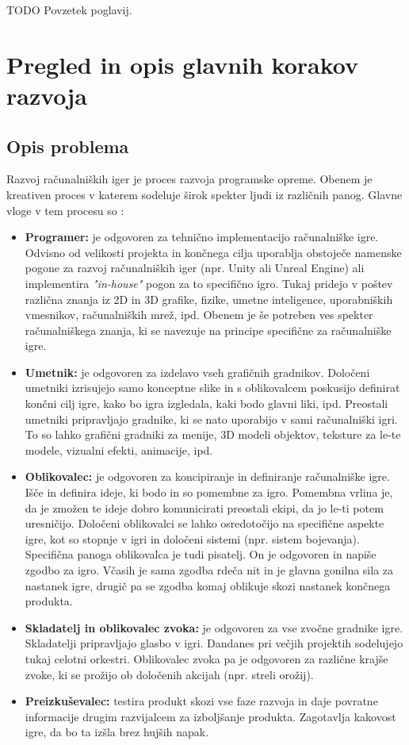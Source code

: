 \documentclass[12pt,a4paper,twoside]{book}
\begin{document}
TODO Povzetek poglavij.

\chapter{Pregled in opis glavnih korakov razvoja}\thispagestyle{fancy}
\section{Opis problema}
\label{sec:opis_problema}
Razvoj računalniških iger je proces razvoja programske opreme. Obenem je kreativen proces v katerem sodeluje širok spekter ljudi iz različnih panog. Glavne vloge v tem procesu so \cite{rogers2014level}:
\begin{itemize}
	\item \textbf{Programer:} je odgovoren za tehnično implementacijo računalniške igre. Odvisno od velikosti projekta in končnega cilja uporablja obstoječe namenske pogone za razvoj računalniških iger (npr. Unity ali Unreal Engine) ali implementira \textit{"in-house"} pogon za to specifično igro. Tukaj pridejo v poštev različna znanja iz 2D in 3D grafike, fizike, umetne inteligence, uporabniških vmesnikov, računalniških mrež, ipd. Obenem je še potreben ves spekter računalniškega znanja, ki se navezuje na principe specifične za računalniške igre.
	\item \textbf{Umetnik:} je odgovoren za izdelavo vseh grafičnih gradnikov. Določeni umetniki izrisujejo samo konceptne slike in s oblikovalcem poskusijo definirat končni cilj igre, kako bo igra izgledala, kaki bodo glavni liki, ipd. Preostali umetniki pripravljajo gradnike, ki se nato uporabijo v sami računalniški igri. To so lahko grafični gradniki za menije, 3D modeli objektov, teksture za le-te modele, vizualni efekti, animacije, ipd.
	\item \textbf{Oblikovalec:} je odgovoren za koncipiranje in definiranje računalniške igre. Išče in definira ideje, ki bodo in so pomembne za igro. Pomembna vrlina je, da je zmožen te ideje dobro komunicirati preostali ekipi, da jo le-ti potem uresničijo. Določeni oblikovalci se lahko osredotočijo na specifične aspekte igre, kot so stopnje v igri in določeni sistemi (npr. sistem bojevanja).
	Specifična panoga oblikovalca je tudi pisatelj. On je odgovoren in napiše zgodbo za igro. Včasih je sama zgodba rdeča nit in je glavna gonilna sila za nastanek igre, drugič pa se zgodba komaj oblikuje skozi nastanek končnega produkta.
	\item \textbf{Skladatelj in oblikovalec zvoka:} je odgovoren za vse zvočne gradnike igre. Skladatelji pripravljajo glasbo v igri. Dandanes pri večjih projektih sodelujejo tukaj celotni orkestri. Oblikovalec zvoka pa je odgovoren za različne krajše zvoke, ki se prožijo ob določenih akcijah (npr. streli orožij).
	\item \textbf{Preizkuševalec:} testira produkt skozi vse faze razvoja in daje povratne informacije drugim razvijalcem za izboljšanje produkta. Zagotavlja kakovost igre, da bo ta izšla brez hujših napak.
\end{itemize}
\end{document}
